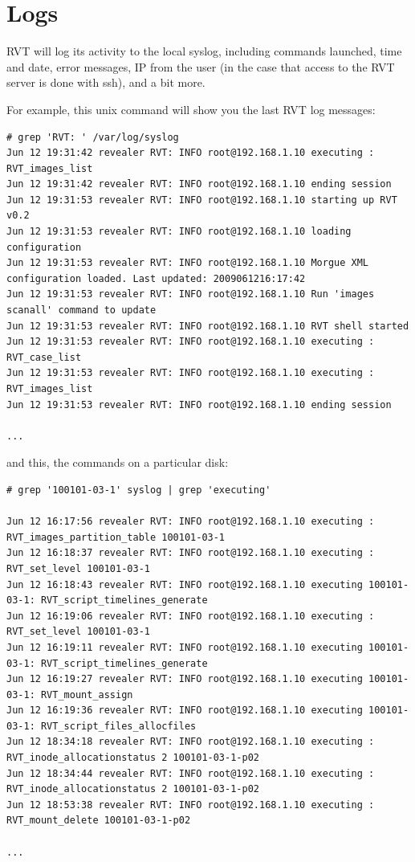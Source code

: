 \documentclass[a4paper,11pt,oneside]{report}
\begin{document}
\section{Logs}

RVT will log its activity to the local syslog, including commands launched, time and date, error messages, IP from the user (in the case that access to the RVT server is done with ssh), and a bit more.

For example, this unix command will show you the last RVT log messages:

{ \footnotesize
\begin{verbatim}
# grep 'RVT: ' /var/log/syslog
Jun 12 19:31:42 revealer RVT: INFO root@192.168.1.10 executing : RVT_images_list  
Jun 12 19:31:42 revealer RVT: INFO root@192.168.1.10 ending session 
Jun 12 19:31:53 revealer RVT: INFO root@192.168.1.10 starting up RVT v0.2 
Jun 12 19:31:53 revealer RVT: INFO root@192.168.1.10 loading configuration 
Jun 12 19:31:53 revealer RVT: INFO root@192.168.1.10 Morgue XML configuration loaded. Last updated: 2009061216:17:42 
Jun 12 19:31:53 revealer RVT: INFO root@192.168.1.10 Run 'images scanall' command to update 
Jun 12 19:31:53 revealer RVT: INFO root@192.168.1.10 RVT shell started 
Jun 12 19:31:53 revealer RVT: INFO root@192.168.1.10 executing : RVT_case_list  
Jun 12 19:31:53 revealer RVT: INFO root@192.168.1.10 executing : RVT_images_list  
Jun 12 19:31:53 revealer RVT: INFO root@192.168.1.10 ending session 

...
\end{verbatim}
}

and this, the commands on a particular disk:

{ \footnotesize
\begin{verbatim}
# grep '100101-03-1' syslog | grep 'executing'

Jun 12 16:17:56 revealer RVT: INFO root@192.168.1.10 executing : RVT_images_partition_table 100101-03-1 
Jun 12 16:18:37 revealer RVT: INFO root@192.168.1.10 executing : RVT_set_level 100101-03-1 
Jun 12 16:18:43 revealer RVT: INFO root@192.168.1.10 executing 100101-03-1: RVT_script_timelines_generate  
Jun 12 16:19:06 revealer RVT: INFO root@192.168.1.10 executing : RVT_set_level 100101-03-1 
Jun 12 16:19:11 revealer RVT: INFO root@192.168.1.10 executing 100101-03-1: RVT_script_timelines_generate  
Jun 12 16:19:27 revealer RVT: INFO root@192.168.1.10 executing 100101-03-1: RVT_mount_assign  
Jun 12 16:19:36 revealer RVT: INFO root@192.168.1.10 executing 100101-03-1: RVT_script_files_allocfiles  
Jun 12 18:34:18 revealer RVT: INFO root@192.168.1.10 executing : RVT_inode_allocationstatus 2 100101-03-1-p02 
Jun 12 18:34:44 revealer RVT: INFO root@192.168.1.10 executing : RVT_inode_allocationstatus 2 100101-03-1-p02 
Jun 12 18:53:38 revealer RVT: INFO root@192.168.1.10 executing : RVT_mount_delete 100101-03-1-p02

...
\end{verbatim}
}
\end{document}
